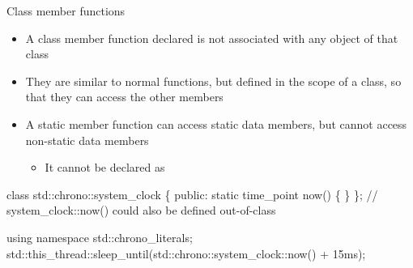 \begin{frame}[fragile]{Class  member functions}

  \begin{itemize}
  \item A class member function declared \alert{} is not associated
    with any object of that class
  \item They are similar to normal functions, but defined in the scope of a
    class, so that they can access the other members
  \item A static member function can access static data members, but cannot
    access non-static data members
    \begin{itemize}
    \item It cannot be declared as 
    \end{itemize}
  \end{itemize}
  \begin{codeblock}
class std::chrono::system_clock \{
 public:
  static time_point now() \{ \ddd \}
  \ddd
\};
// system_clock::now() could also be defined out-of-class\end{codeblock}
    \begin{codeblock}
using namespace std::chrono_literals;
std::this_thread\alert{::}sleep_until(std::chrono::system_clock\alert{::}now() + 15ms);\end{codeblock}

\end{frame}
